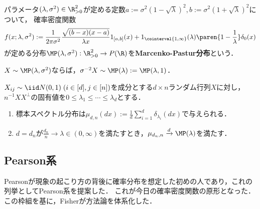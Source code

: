 \documentclass[uplatex,dvipdfmx]{jsreport}
\begin{document}
\begin{definition}
    パラメータ$(\lambda,\sigma^2)\in\R^2_{>0}$が定める定数$a:=\sigma^2(1-\sqrt{\lambda})^2,b:=\sigma^2(1+\sqrt{\lambda})^2$について，
    確率密度関数
    \[f(x;\lambda,\sigma^2):=\frac{1}{2\pi\sigma^2}\frac{\sqrt{(b-x)(x-a)}}{\lambda x}1_{[a,b]}(x)+1_{\cointerval{1,\infty}}(\lambda)\paren{1-\frac{1}{\lambda}}\delta_0(x)\]
    が定める分布$\MP(\lambda,\sigma^2):\R_{>0}^2\to P(\R)$を\textbf{Marcenko-Pastur分布}という．
\end{definition}

\begin{lemma}
    $X\sim\MP(\lambda,\sigma^2)$ならば，$\sigma^{-2}X\sim\MP(\lambda):=\MP(\lambda,1)$．
\end{lemma}

\begin{proposition}
    $X_{ij}\sim\iid N(0,1)\;(i\in[d],j\in[n])$を成分とする$d\times n$ランダム行列$X$に対し，$n^{-1}XX^\perp$の固有値を$0\le\lambda_1\le\cdots\le\lambda_d$とする．
    \begin{enumerate}
        \item 標本スペクトル分布は$\mu_{d,n}(dx):=\frac{1}{d}\sum^d_{i=1}\delta_{\lambda_i}(dx)$で与えられる．
        \item $d=d_n$が$\frac{d_n}{n}\to\lambda\in(0,\infty)$を満たすとき，$\mu_{d_n,n}\xrightarrow{d}\MP(\lambda)$を満たす．
    \end{enumerate}
\end{proposition}

\subsection{Pearson系}

\begin{tcolorbox}[colframe=ForestGreen, colback=ForestGreen!10!white,breakable,colbacktitle=ForestGreen!40!white,coltitle=black,fonttitle=\bfseries\sffamily,
title=]
    Pearsonが現象の起こり方の背後に確率分布を想定した初めの人であり，これの列挙としてPearson系を提案した．
    これが今日の確率密度関数の原形となった．
    この枠組を基に，Fisherが方法論を体系化した．
\end{tcolorbox}
\end{document}
